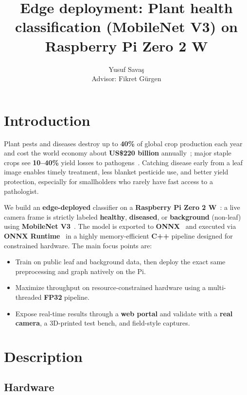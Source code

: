 \documentclass[a4paper,onesided,12pt]{report}
\title{Edge deployment: Plant health classification (MobileNet V3) on Raspberry Pi Zero 2 W}
\author{Yusuf Savaş \\ Advisor: Fikret Gürgen}
\begin{document}
\maketitle{}
\tableofcontents


\chapter{Introduction}

Plant pests and diseases destroy up to \textbf{40\%} of global crop production each year and cost the world economy about \textbf{US\$220 billion} annually~\cite{fao2021pests}; major staple crops see \textbf{10--40\%} yield losses to pathogens~\cite{savary2019global}. Catching disease early from a leaf image enables timely treatment, less blanket pesticide use, and better yield protection, especially for smallholders who rarely have fast access to a pathologist.

We build an \textbf{edge-deployed} classifier on a \textbf{Raspberry Pi Zero 2 W}~\cite{raspberrypi_zero2w}: a live camera frame is strictly labeled \textbf{healthy}, \textbf{diseased}, or \textbf{background} (non-leaf) using \textbf{MobileNet V3}~\cite{howard2019mobilenetv3}. The model is exported to \textbf{ONNX}~\cite{onnx} and executed via \textbf{ONNX Runtime}~\cite{onnxruntime} in a highly memory-efficient \textbf{C++} pipeline designed for constrained hardware. The main focus points are:
\begin{itemize}
\item Train on public leaf and background data, then deploy the exact same preprocessing and graph natively on the Pi.
\item Maximize throughput on resource-constrained hardware using a multi-threaded \textbf{FP32} pipeline.
\item Expose real-time results through a \textbf{web portal} and validate with a \textbf{real camera}, a 3D-printed test bench, and field-style captures.
\end{itemize}

\chapter{Description}

\section{Hardware}
\end{document}
